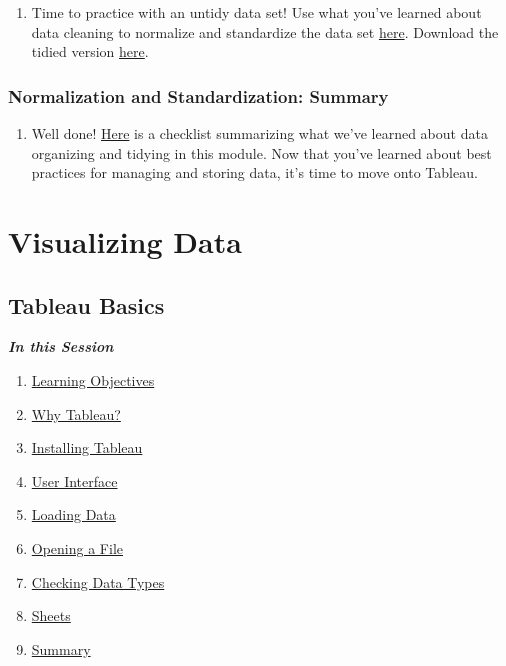 \documentclass[
]{book}
\providecommand{\tightlist}{%
  \setlength{\itemsep}{0pt}\setlength{\parskip}{0pt}}
\begin{document}
\begin{enumerate}
\def\labelenumi{\arabic{enumi}.}
\tightlist
\item
  Time to practice with an untidy data set! Use what you've learned about data cleaning to normalize and standardize the data set \href{files/M2S3_exercise.xlsx}{here}. Download the tidied version \href{files/M2S3_exercise_key.xlsx}{here}.
\end{enumerate}

\hypertarget{normalization-and-standardization-summary}{%
\subsection{Normalization and Standardization: Summary}\label{normalization-and-standardization-summary}}

\begin{enumerate}
\def\labelenumi{\arabic{enumi}.}
\tightlist
\item
  Well done! \href{files/data_processing_checklist.docx}{Here} is a checklist summarizing what we've learned about data organizing and tidying in this module. Now that you've learned about best practices for managing and storing data, it's time to move onto Tableau.
\end{enumerate}

\hypertarget{visualizing-data}{%
\chapter{Visualizing Data}\label{visualizing-data}}

\hypertarget{tableau-basics}{%
\section{Tableau Basics}\label{tableau-basics}}

\textbf{\emph{In this Session}}

\begin{enumerate}
\def\labelenumi{\arabic{enumi}.}
\tightlist
\item
  \protect\hyperlink{tableau-basics-learning-objectives}{Learning Objectives}
\item
  \protect\hyperlink{why-tableau}{Why Tableau?}
\item
  \protect\hyperlink{installing-tableau}{Installing Tableau}
\item
  \protect\hyperlink{user-interface}{User Interface}
\item
  \protect\hyperlink{loading-data}{Loading Data}
\item
  \protect\hyperlink{opening-a-file}{Opening a File}
\item
  \protect\hyperlink{checking-data-types}{Checking Data Types}
\item
  \protect\hyperlink{sheets}{Sheets}
\item
  \protect\hyperlink{tableau-basics-summary}{Summary}
\end{enumerate}
\end{document}
